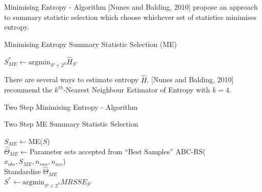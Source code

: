 \documentclass[aspectratio=169]{beamer}
\begin{document}
\begin{frame}{Minimising Entropy - Algorithm}
  [Nunes and Balding, 2010] propose an approach to summary statistic selection which choose whichever set of statistics minimises entropy.
  \begin{block}{Minimising Entropy Summary Statistic Selection (ME)}
    \begin{algorithm}[H]
      $S_{ME}^*\leftarrow\text{argmin}_{S'\in 2^S}\hat{H}_{S'}$\\
    \end{algorithm}
  \end{block}

  There are several ways to estimate entropy $\hat{H}$. [Nunes and Balding, 2010] recommend the $k^{th}$-Nearest Neighbour Estimator of Entropy with $k=4$.
\end{frame}

\begin{frame}{Two Step Minimising Entropy - Algorithm}
  \begin{block}{Two Step ME Summary Statistic Selection}
    \begin{algorithm}[H]
      $S_{ME}\leftarrow$ME($S$)\\
      $\hat{\Theta}_{ME}\leftarrow${\small Parameter sets accepted from ``Best Samples'' ABC-RS($x_{obs},S_{ME},n_{run},n_{acc}$)}\\
      Standardise $\hat\Theta_{ME}$\\
      $S^*\leftarrow\text{argmin}_{S'\in 2^S}MRSSE_{S'}$\\
    \end{algorithm}
  \end{block}
\end{frame}
\end{document}
